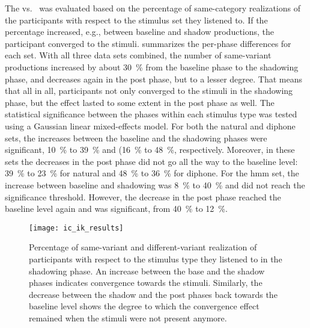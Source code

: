 The \textipa{[I\c{c}]} vs.\ \textipa{[Ik]} was evaluated based on the percentage of same-category realizations of the participants with respect to the stimulus set they listened to.
If the percentage increased, e.g., between baseline and shadow productions, the participant converged to the stimuli.
 summarizes the per-phase differences for each set.
With all three data sets combined, the number of same-variant productions increased by about \SI{30}{\percent} from the baseline phase to the shadowing phase, and decreases again in the post phase, but to a lesser degree.
That means that all in all, participants not only converged to the stimuli in the shadowing phase, but the effect lasted to some extent in the post phase as well.
The statistical significance between the phases within each stimulus type was tested using a Gaussian linear mixed-effects model.
For both the natural and diphone sets, the increases between the baseline and the shadowing phases were significant, \SI{10}{\percent} to \SI{39}{\percent} and (\SI{16}{\percent} to \SI{48}{\percent}, respectively.
Moreover, in these sets the decreases in the post phase did not go all the way to the baseline level: \SI{39}{\percent} to \SI{23}{\percent} for natural and \SI{48}{\percent} to \SI{36}{\percent} for diphone.
For the \ac{hmm} set, the increase between baseline and shadowing was \SI{8}{\percent} to \SI{40}{\percent} and did not reach the significance threshold.
However, the decrease in the post phase reached the baseline level again and was significant, from \SI{40}{\percent} to \SI{12}{\percent}.
%
\begin{figure}[t]
	\centering
	\texttt{[image: ic\_ik\_results]}
	\caption[Convergence results for \textipa{[I\c{c}]} vs.\ \textipa{[Ik]} with three stimuli sets]
		{Percentage of same-variant and different-variant realization of participants with respect to the stimulus type they listened to in the shadowing phase.
		An increase between the base and the shadow phases indicates convergence towards the stimuli.
		Similarly, the decrease between the shadow and the post phases back towards the baseline level shows the degree to which the convergence effect remained when the stimuli were not present anymore.}
	\label{fig:ic_ik_results}
\end{figure}
%

